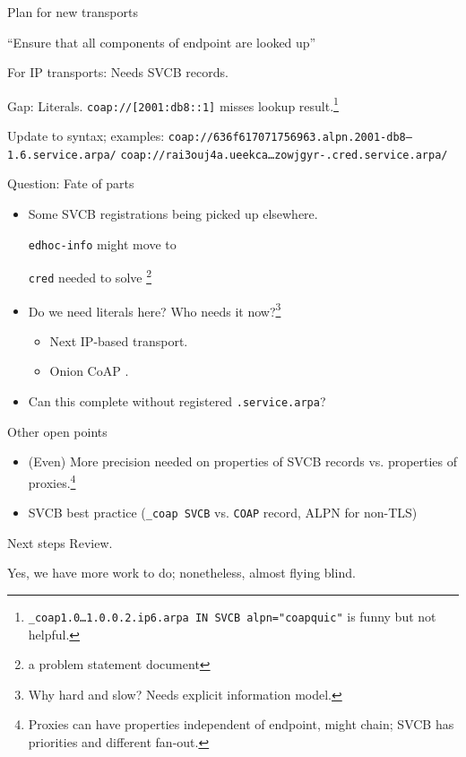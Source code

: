 \begin{frame}{Plan for new transports}\Large
    {\color{gray}
    ``Ensure that all components of endpoint are looked up''

    \bigskip

    For IP transports: Needs SVCB records.

    \bigskip

    Gap: Literals. \texttt{coap://[2001:db8::1]} misses lookup result.\footnote{
        \texttt{\_coap1.0…1.0.0.2.ip6.arpa IN SVCB alpn="coapquic"} is funny but not helpful.}
    }

    \vspace{1cm}

    Update to syntax; examples:
    \texttt{coap://636f617071756963.alpn.2001-db8--1.6.service.arpa/}
    \texttt{coap://rai3ouj4a.ueekca…zowjgyr-.cred.service.arpa/}
\end{frame}

\begin{frame}{Question: Fate of parts}\Large
    \begin{itemize}
        \item Some SVCB registrations being picked up elsewhere.
            \bigskip

            \texttt{edhoc-info} might move to 

            \texttt{cred} needed to solve \footnote{a problem statement document}

            \bigskip
        \item Do we need literals here? Who needs it now?\footnote{Why hard and slow? Needs explicit information model.}
            \begin{itemize}\Large
                \item Next IP-based transport.
                \item Onion CoAP .
            \end{itemize}
            \bigskip

        \item Can this complete without registered \texttt{.service.arpa}?
    \end{itemize}
\end{frame}

\begin{frame}{Other open points}\Large
    \begin{itemize}
        \item (Even) More precision needed on properties of SVCB records vs. properties of proxies.\footnote{Proxies can have properties independent of endpoint, might chain; SVCB has priorities and different fan-out.}
            \bigskip
        \item SVCB best practice (\texttt{\_coap SVCB} vs. \texttt{COAP} record, ALPN for non-TLS)
    \end{itemize}
\end{frame}

\begin{frame}{Next steps}\Huge
    Review.

    \vspace{2cm}
    
    \large
    Yes, we have more work to do; nonetheless, almost flying blind.
\end{frame}


